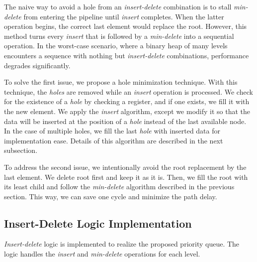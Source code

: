 \documentclass[10pt, conference, compsocconf]{IEEEtran}
\begin{document}
The naive way to avoid a hole from an {\it insert-delete} combination is to stall {\it min-delete} from entering the pipeline until {\it insert} completes. 
When the latter operation begins, the correct last element would replace the root. 
However, this method turns every {\it insert} that is followed by a {\it min-delete} into a sequential operation. 
In the worst-case scenario, where a binary heap of many levels encounters a sequence with nothing but {\it insert-delete} combinations, performance degrades significantly.

To solve the first issue, we propose a hole minimization technique.
With this technique, the {\it holes} are removed while an {\it insert} operation is processed.
We check for the existence of a {\it hole} by checking a register, and if one exists, we fill it with the new element. 
We apply the {\it insert} algorithm, except we modify it so that the data will be inserted at the position of a {\it hole} instead of the last available node. 
In the case of multiple holes, we fill the last {\it hole} with inserted data for implementation ease.
Details of this algorithm are described in the next subsection.

To address the second issue, we intentionally avoid the root replacement by the last element.
We delete root first and keep it as it is. 
Then, we fill the root with its least child and follow the {\it min-delete} algorithm described in the previous section.
This way, we can save one cycle and minimize the path delay.

\subsection{Insert-Delete Logic Implementation}

{\it Insert-delete} logic is implemented to realize the proposed priority queue.
The logic handles the {\it insert} and {\it min-delete} operations for each level.
\end{document}
